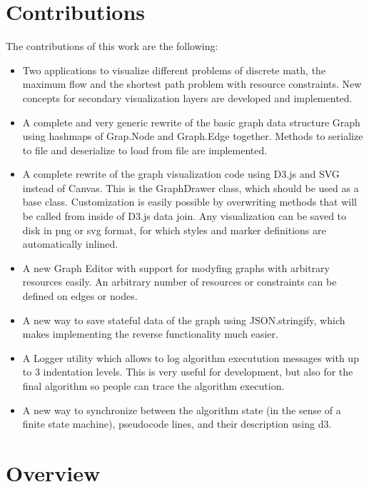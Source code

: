 \section{Contributions}
The contributions of this work are the following:
\begin{itemize}
	\item Two applications to visualize different problems of discrete math, the maximum flow and the shortest path problem with resource constraints. New concepts for secondary visualization layers are developed and implemented.
	\item A complete and very generic rewrite of the basic graph data structure Graph using hashmaps of Grap.Node and Graph.Edge together. Methods to serialize to file and deserialize to load from file are implemented.
	\item A complete rewrite of the graph visualization code using D3.js and SVG instead of Canvas. This is the GraphDrawer class, which should be used as a base class. Customization is easily possible by overwriting methods that will be called from inside of D3.js data join. Any visualization can be saved to disk in png or svg format, for which styles and marker definitions are automatically inlined.
	\item A new Graph Editor with support for modyfing graphs with arbitrary resources easily. An arbitrary number of resources or constraints can be defined on edges or nodes.
	\item A new way to save stateful data of the graph using JSON.stringify, which makes implementing the reverse functionality much easier.
	\item A Logger utility which allows to log algorithm executution messages with up to 3 indentation levels. This is very useful for development, but also for the final algorithm so people can trace the algorithm execution.
	\item A new way to synchronize between the algorithm state (in the sense of a finite state machine), pseudocode lines, and their description using d3.
\end{itemize}

\section{Overview}
